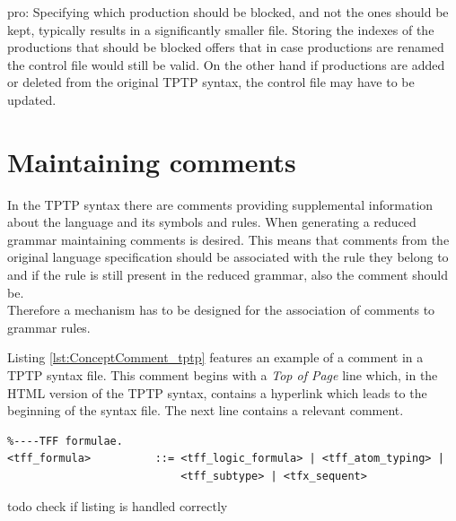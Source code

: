 pro: Specifying which production should be blocked, and not the ones should be kept, typically results in a significantly smaller file.
Storing the indexes of the productions that should be blocked offers that in case productions are renamed the control file would still be valid. On the other hand if productions are added or deleted from the original \ac{TPTP} syntax, the control file may have to be updated.

\section{Maintaining comments}\label{sec:ConceptMaintainingComments}
In the \ac{TPTP} syntax there are comments providing supplemental information about the language and its symbols and rules.
When generating a reduced grammar maintaining comments is desired. This means that comments from the original language specification should be associated with the rule they belong to and if the rule is still present in the reduced grammar, also the comment should be.\\
Therefore a mechanism has to be designed for the association of comments to grammar rules.

Listing \ref{lst:ConceptComment_tptp} features an example of a comment in a \ac{TPTP} syntax file. This comment begins with a \textit{Top of Page} line which, in the HTML version of the \ac{TPTP} syntax, contains a hyperlink which leads to the beginning of the syntax file.
The next line contains a relevant comment.\\
\begin{lstlisting}[language=none, basicstyle=\scriptsize	,caption= Comment in the \ac{TPTP} syntax,label= lst:ConceptComment_tptp]
%----Top of Page---------------------------------------------------------------
%----TFF formulae.
<tff_formula>          ::= <tff_logic_formula> | <tff_atom_typing> |
                           <tff_subtype> | <tfx_sequent>
\end{lstlisting}
todo check if listing is handled correctly


